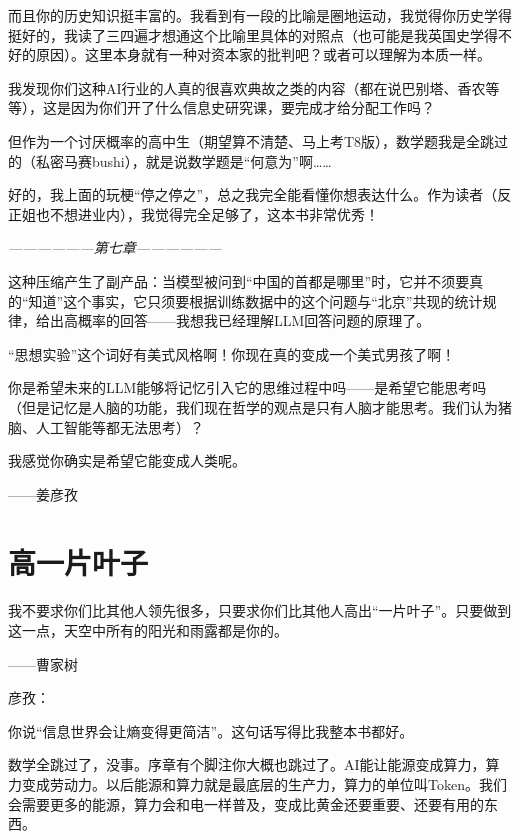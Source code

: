 \begin{myquote}
而且你的历史知识挺丰富的。我看到有一段的比喻是圈地运动，我觉得你历史学得挺好的，我读了三四遍才想通这个比喻里具体的对照点（也可能是我英国史学得不好的原因）。这里本身就有一种对资本家的批判吧？或者可以理解为本质一样。

我发现你们这种AI行业的人真的很喜欢典故之类的内容（都在说巴别塔、香农等等），这是因为你们开了什么信息史研究课，要完成才给分配工作吗？

但作为一个讨厌概率的高中生（期望算不清楚、马上考T8版），数学题我是全跳过的（私密马赛bushi），就是说数学题是“何意为”啊……

好的，我上面的玩梗“停之停之”，总之我完全能看懂你想表达什么。作为读者（反正姐也不想进业内），我觉得完全足够了，这本书非常优秀！

\textit{------------------第七章------------------}

这种压缩产生了副产品：当模型被问到“中国的首都是哪里”时，它并不须要真的“知道”这个事实，它只须要根据训练数据中的这个问题与“北京”共现的统计规律，给出高概率的回答——我想我已经理解LLM回答问题的原理了。

“思想实验”这个词好有美式风格啊！你现在真的变成一个美式男孩了啊！

你是希望未来的LLM能够将记忆引入它的思维过程中吗——是希望它能思考吗（但是记忆是人脑的功能，我们现在哲学的观点是只有人脑才能思考。我们认为猪脑、人工智能等都无法思考）？

我感觉你确实是希望它能变成人类呢。

\hfill ——姜彦孜
\end{myquote}




\newpage
\section*{高一片叶子}

\begin{myquote}
我不要求你们比其他人领先很多，只要求你们比其他人高出“一片叶子”。只要做到这一点，天空中所有的阳光和雨露都是你的。

\hfill ——曹家树
\end{myquote}

\vspace{1em}

彦孜：

你说“信息世界会让熵变得更简洁”。这句话写得比我整本书都好。

数学全跳过了，没事。序章有个脚注你大概也跳过了。AI能让能源变成算力，算力变成劳动力。以后能源和算力就是最底层的生产力，算力的单位叫Token。我们会需要更多的能源，算力会和电一样普及，变成比黄金还要重要、还要有用的东西。

